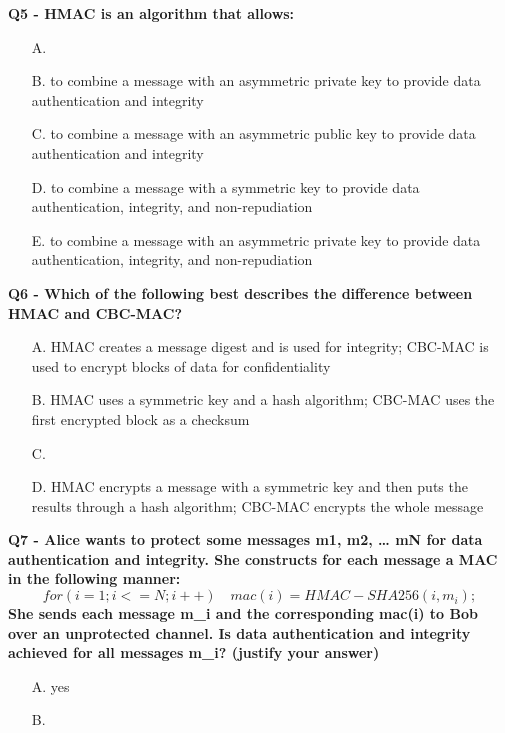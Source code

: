 \textbf{Q5 - HMAC is an algorithm that allows:}
\begin{enumerate}
    \item[A.] 
    \item[B.] to combine a message with an asymmetric private key to provide data authentication and integrity
    \item[C.] to combine a message with an asymmetric public key to provide data authentication and integrity
    \item[D.] to combine a message with a symmetric key to provide data authentication, integrity, and non-repudiation
    \item[E.] to combine a message with an asymmetric private key to provide data authentication, integrity, and non-repudiation
\end{enumerate}

\textbf{Q6 - Which of the following best describes the difference between HMAC and CBC-MAC?}
\begin{enumerate}
    \item[A.] HMAC creates a message digest and is used for integrity; CBC-MAC is used to encrypt blocks of data for confidentiality
    \item[B.] HMAC uses a symmetric key and a hash algorithm; CBC-MAC uses the first encrypted block as a checksum
    \item[C.] 
    \item[D.] HMAC encrypts a message with a symmetric key and then puts the results through a hash algorithm; CBC-MAC encrypts the whole message
\end{enumerate}

\textbf{Q7 - Alice wants to protect some messages m1, m2, … mN for data authentication and integrity. She constructs for each message a MAC in the following manner:}
\textbf{\[for (i=1; i<=N; i++) \quad mac(i) = HMAC-SHA256( i, m_{i} );\]}
\textbf{She sends each message m_{i} and the corresponding mac(i)
to Bob over an unprotected channel.
Is data authentication and integrity achieved for all messages m_{i}? (justify your answer)}
\begin{enumerate}
    \item[A.] yes  
    \item[B.] 
\end{enumerate}

